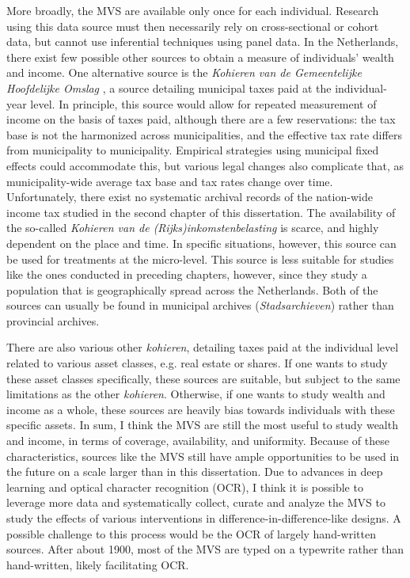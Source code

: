 More broadly, the MVS are available only once for each individual. Research using this data source must then necessarily rely on cross-sectional or cohort data, but cannot use inferential techniques using panel data. In the Netherlands, there exist few possible other sources to obtain a measure of individuals' wealth and income. One alternative source is the \textit{Kohieren van de Gemeentelijke Hoofdelijke Omslag} \citep{klep1987kohieren}, a source detailing municipal taxes paid at the individual-year level. In principle, this source would allow for repeated measurement of income on the basis of taxes paid, although there are a few reservations: the tax base is not the harmonized across municipalities, and the effective tax rate differs from municipality to municipality. Empirical strategies using municipal fixed effects could accommodate this, but various legal changes also complicate that, as municipality-wide average tax base and tax rates change over time. Unfortunately, there exist no systematic archival records of the nation-wide income tax studied in the second chapter of this dissertation. The availability of the so-called \textit{Kohieren van de (Rijks)inkomstenbelasting} is scarce, and highly dependent on the place and time. In specific situations, however, this source can be used for treatments at the micro-level. This source is less suitable for studies like the ones conducted in preceding chapters, however, since they study a population that is geographically spread across the Netherlands. Both of the sources can usually be found in municipal archives (\textit{Stadsarchieven}) rather than provincial archives. 

There are also various other \textit{kohieren}, detailing taxes paid at the individual level related to various asset classes, e.g. real estate or shares. If one wants to study these asset classes specifically, these sources are suitable, but subject to the same limitations as the other \textit{kohieren}. Otherwise, if one wants to study wealth and income as a whole, these sources are heavily bias towards individuals with these specific assets. In sum, I think the MVS are still the most useful to study wealth and income, in terms of coverage, availability, and uniformity. Because of these characteristics, sources like the MVS still have ample opportunities to be used in the future on a scale larger than in this dissertation. Due to advances in deep learning \citep{shen2021layoutparser} and optical character recognition (OCR), I think it is possible to leverage more data and systematically collect, curate and analyze the MVS to study the effects of various interventions in difference-in-difference-like designs. A possible challenge to this process would be the OCR of largely hand-written sources. After about 1900, most of the MVS are typed on a typewrite rather than hand-written, likely facilitating OCR. 

